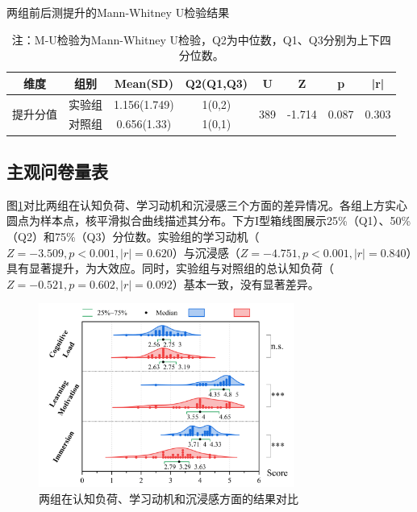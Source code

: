 \documentclass[runningheads]{llncs}
\begin{document}
\begin{table}[t]
\centering
\setlength{\tabcolsep}{6pt} %
\caption{两组前后测提升的Mann-Whitney U检验结果}
\label{tab:learning-effect}
\begin{tabular}{cccccccc}
\toprule
\textbf{维度} & \textbf{组别} & \textbf{Mean(SD)} & \textbf{Q2(Q1,Q3)} & \textbf{U} & \textbf{Z} & \textbf{p} & \textbf{|r|} \\
\midrule
\multirow{2}{*}{提升分值} 
& 实验组 & 1.156(1.749) & 1(0,2) & \multirow{2}{*}{389} & \multirow{2}{*}{-1.714} & \multirow{2}{*}{0.087} & \multirow{2}{*}{0.303} \\
& 对照组 & 0.656(1.33) & 1(0,1) \\
\bottomrule
\end{tabular}
\caption*{注：M-U检验为Mann-Whitney U检验，Q2为中位数，Q1、Q3分别为上下四分位数。}
\end{table}

\subsection{主观问卷量表}
图\ref{fig:user-experience-result}对比两组在认知负荷、学习动机和沉浸感三个方面的差异情况。各组上方实心圆点为样本点，核平滑拟合曲线描述其分布。下方I型箱线图展示25\%（Q1）、50\%（Q2）和75\%（Q3）分位数。实验组的学习动机（$Z=-3.509,p<0.001,|r|=0.620$）与沉浸感（$Z=-4.751,p<0.001,|r|=0.840$）具有显著提升，为大效应。同时，实验组与对照组的总认知负荷（$Z=-0.521,p=0.602,|r|=0.092$）基本一致，没有显著差异。

\begin{figure}[t]
  \centering
  \includegraphics[width=0.75\textwidth]{image/user-experience-result.pdf}
  \caption{两组在认知负荷、学习动机和沉浸感方面的结果对比}
  \label{fig:user-experience-result}
\end{figure}
\end{document}
